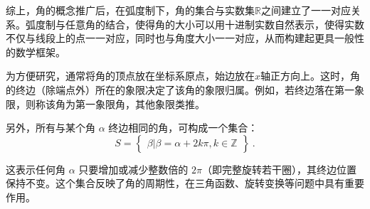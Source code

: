 综上，角的概念推广后，在弧度制下，角的集合与实数集$\mathbb{R}$之间建立了一一对应关系。弧度制与任意角的结合，使得角的大小可以用十进制实数自然表示，使得实数不仅与线段上的点一一对应，同时也与角度大小一一对应，从而构建起更具一般性的数学框架。

为方便研究，通常将角的顶点放在坐标系原点，始边放在$x$轴正方向上。这时，角的终边（除端点外）所在的象限决定了该角的象限归属。例如，若终边落在第一象限，则称该角为第一象限角，其他象限类推。

另外，所有与某个角 $\alpha$ 终边相同的角，可构成一个集合：
\begin{equation}
S = \begin{Bmatrix} \beta|\beta=\alpha+2k\pi,k \in \mathbb{Z} \end{Bmatrix}~.
\end{equation}

这表示任何角 $\alpha$ 只要增加或减少整数倍的 $2\pi$（即完整旋转若干圈），其终边位置保持不变。这个集合反映了角的周期性，在三角函数、旋转变换等问题中具有重要作用。

